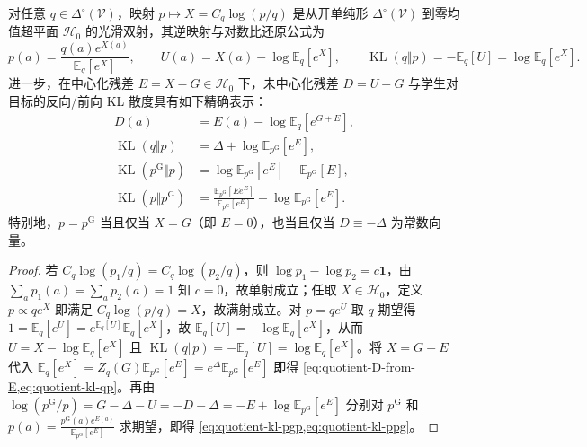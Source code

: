 \documentclass[lang=cn,scheme=chinese,openany]{../book/elegantbook}
\newcommand{\E}{\mathbb E}
\newcommand{\KL}{\operatorname{KL}}
\begin{document}
\begin{theorem}[全耦合商空间坐标双射]
\label{thm:quotient-bijection}
对任意 $q\in\Delta^\circ(\mathcal V)$，映射 $p\mapsto X=C_q\log(p/q)$ 是从开单纯形 $\Delta^\circ(\mathcal V)$ 到零均值超平面 $\mathcal H_0$ 的光滑双射，其逆映射与对数比还原公式为
\begin{equation}
 p(a)=\frac{q(a)e^{X(a)}}{\E_q[e^X]},
 \qquad
 U(a)=X(a)-\log\E_q[e^X],
 \qquad
 \KL(q\Vert p)=-\E_q[U]=\log\E_q[e^X].
 \label{eq:quotient-inverse}
\end{equation}
进一步，在中心化残差 $E=X-G\in\mathcal H_0$ 下，未中心化残差 $D=U-G$ 与学生对目标的反向/前向 KL 散度具有如下精确表示：
\begin{align}
 D(a) &= E(a)-\log\E_q[e^{G+E}], \label{eq:quotient-D-from-E}\\
 \KL(q\Vert p) &= \Delta+\log\E_{p^{\mathrm G}}[e^E], \label{eq:quotient-kl-qp}\\
 \KL(p^{\mathrm G}\Vert p) &= \log\E_{p^{\mathrm G}}[e^E]-\E_{p^{\mathrm G}}[E], \label{eq:quotient-kl-pgp}\\
 \KL(p\Vert p^{\mathrm G}) &= \frac{\E_{p^{\mathrm G}}[E e^E]}{\E_{p^{\mathrm G}}[e^E]}-\log\E_{p^{\mathrm G}}[e^E]. \label{eq:quotient-kl-ppg}
\end{align}
特别地，$p=p^{\mathrm G}$ 当且仅当 $X=G$（即 $E=0$），也当且仅当 $D\equiv -\Delta$ 为常数向量。
\end{theorem}
\begin{proof}
若 $C_q\log(p_1/q)=C_q\log(p_2/q)$，则 $\log p_1-\log p_2=c\mathbf 1$，由 $\sum_a p_1(a)=\sum_a p_2(a)=1$ 知 $c=0$，故单射成立；任取 $X\in\mathcal H_0$，定义 $p\propto q e^X$ 即满足 $C_q\log(p/q)=X$，故满射成立。对 $p=q e^U$ 取 $q$-期望得 $1=\E_q[e^U]=e^{\E_q[U]}\E_q[e^X]$，故 $\E_q[U]=-\log\E_q[e^X]$，从而 $U=X-\log\E_q[e^X]$ 且 $\KL(q\Vert p)=-\E_q[U]=\log\E_q[e^X]$。将 $X=G+E$ 代入 $\E_q[e^X]=Z_q(G)\E_{p^{\mathrm G}}[e^E]=e^\Delta\E_{p^{\mathrm G}}[e^E]$ 即得 \cref{eq:quotient-D-from-E,eq:quotient-kl-qp}。再由 $\log(p^{\mathrm G}/p)=G-\Delta-U=-D-\Delta=-E+\log\E_{p^{\mathrm G}}[e^E]$ 分别对 $p^{\mathrm G}$ 和 $p(a)=\frac{p^{\mathrm G}(a)e^{E(a)}}{\E_{p^{\mathrm G}}[e^E]}$ 求期望，即得 \cref{eq:quotient-kl-pgp,eq:quotient-kl-ppg}。
\end{proof}
\end{document}

